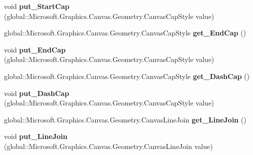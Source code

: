 \begin{DoxyCompactItemize}
void {\bfseries put\+\_\+\+Start\+Cap} (global\+::\+Microsoft.\+Graphics.\+Canvas.\+Geometry.\+Canvas\+Cap\+Style value)
\item 
\mbox{\label{interface_microsoft_1_1_graphics_1_1_canvas_1_1_geometry_1_1_i_canvas_stroke_style_aab45339696dfcadb0ae0eb8e89bb68e4}} 
global\+::\+Microsoft.\+Graphics.\+Canvas.\+Geometry.\+Canvas\+Cap\+Style {\bfseries get\+\_\+\+End\+Cap} ()
\item 
\mbox{\label{interface_microsoft_1_1_graphics_1_1_canvas_1_1_geometry_1_1_i_canvas_stroke_style_aef264fbe0fcf18df425b8904ea4dca31}} 
void {\bfseries put\+\_\+\+End\+Cap} (global\+::\+Microsoft.\+Graphics.\+Canvas.\+Geometry.\+Canvas\+Cap\+Style value)
\item 
\mbox{\label{interface_microsoft_1_1_graphics_1_1_canvas_1_1_geometry_1_1_i_canvas_stroke_style_a6460321748d903188a3fd0c96b9309df}} 
global\+::\+Microsoft.\+Graphics.\+Canvas.\+Geometry.\+Canvas\+Cap\+Style {\bfseries get\+\_\+\+Dash\+Cap} ()
\item 
\mbox{\label{interface_microsoft_1_1_graphics_1_1_canvas_1_1_geometry_1_1_i_canvas_stroke_style_a2c6fb2a6009bda6b6bf0b8882ec5b651}} 
void {\bfseries put\+\_\+\+Dash\+Cap} (global\+::\+Microsoft.\+Graphics.\+Canvas.\+Geometry.\+Canvas\+Cap\+Style value)
\item 
\mbox{\label{interface_microsoft_1_1_graphics_1_1_canvas_1_1_geometry_1_1_i_canvas_stroke_style_aa99219b6d76643e93de91296b3261eb8}} 
global\+::\+Microsoft.\+Graphics.\+Canvas.\+Geometry.\+Canvas\+Line\+Join {\bfseries get\+\_\+\+Line\+Join} ()
\item 
\mbox{\label{interface_microsoft_1_1_graphics_1_1_canvas_1_1_geometry_1_1_i_canvas_stroke_style_a9917a7ec85d18fa2508e01a5bea88eb8}} 
void {\bfseries put\+\_\+\+Line\+Join} (global\+::\+Microsoft.\+Graphics.\+Canvas.\+Geometry.\+Canvas\+Line\+Join value)

\end{DoxyCompactItemize}
